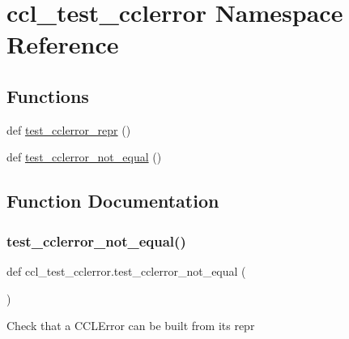 \hypertarget{namespaceccl__test__cclerror}{}\section{ccl\+\_\+test\+\_\+cclerror Namespace Reference}
\label{namespaceccl__test__cclerror}
\subsection*{Functions}
\begin{DoxyCompactItemize}
\item 
def \mbox{\hyperlink{namespaceccl__test__cclerror_a376e68906fd92e328d238f8bd5d7fb11}{test\+\_\+cclerror\+\_\+repr}} ()
\item 
def \mbox{\hyperlink{namespaceccl__test__cclerror_afff946ac141db9569726348d56b88cd1}{test\+\_\+cclerror\+\_\+not\+\_\+equal}} ()
\end{DoxyCompactItemize}


\subsection{Function Documentation}
\mbox{\label{namespaceccl__test__cclerror_afff946ac141db9569726348d56b88cd1}} 
\subsubsection{\texorpdfstring{test\+\_\+cclerror\+\_\+not\+\_\+equal()}{test\_cclerror\_not\_equal()}}
{\footnotesize\ttfamily def ccl\+\_\+test\+\_\+cclerror.\+test\+\_\+cclerror\+\_\+not\+\_\+equal (\begin{DoxyParamCaption}{ }\end{DoxyParamCaption})}

\begin{DoxyVerb}Check that a CCLError can be built from its repr\end{DoxyVerb}
 \mbox{\label{namespaceccl__test__cclerror_a376e68906fd92e328d238f8bd5d7fb11}} 
